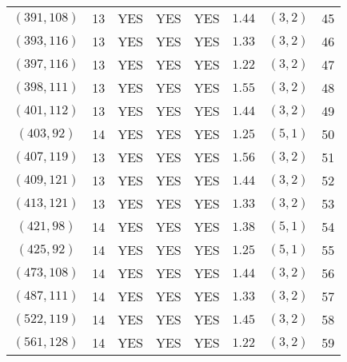 \begin{longtable}{|c|c|c|c|c|c|c|c|}
$(391,108)$ & 13 & YES & YES & YES & $1.44$ & $(3,2)$ & 45\\
$(393,116)$ & 13 & YES & YES & YES & $1.33$ & $(3,2)$ & 46\\
$(397,116)$ & 13 & YES & YES & YES & $1.22$ & $(3,2)$ & 47\\
$(398,111)$ & 13 & YES & YES & YES & $1.55$ & $(3,2)$ & 48\\
$(401,112)$ & 13 & YES & YES & YES & $1.44$ & $(3,2)$ & 49\\
$(403,92)$ & 14 & YES & YES & YES & $1.25$ & $(5,1)$ & 50\\
$(407,119)$ & 13 & YES & YES & YES & $1.56$ & $(3,2)$ & 51\\
$(409,121)$ & 13 & YES & YES & YES & $1.44$ & $(3,2)$ & 52\\
$(413,121)$ & 13 & YES & YES & YES & $1.33$ & $(3,2)$ & 53\\
$(421,98)$ & 14 & YES & YES & YES & $1.38$ & $(5,1)$ & 54\\
$(425,92)$ & 14 & YES & YES & YES & $1.25$ & $(5,1)$ & 55\\
$(473,108)$ & 14 & YES & YES & YES & $1.44$ & $(3,2)$ & 56\\
$(487,111)$ & 14 & YES & YES & YES & $1.33$ & $(3,2)$ & 57\\
$(522,119)$ & 14 & YES & YES & YES & $1.45$ & $(3,2)$ & 58\\
$(561,128)$ & 14 & YES & YES & YES & $1.22$ & $(3,2)$ & 59
\end{longtable}

